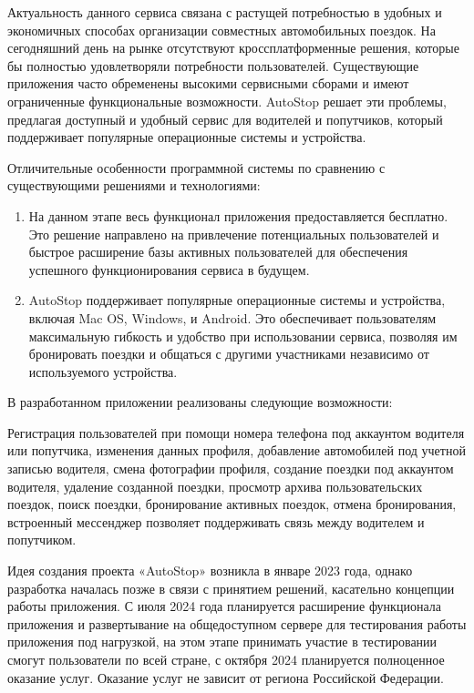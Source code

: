 Актуальность данного сервиса связана с растущей потребностью в удобных и экономичных способах организации совместных автомобильных поездок. На сегодняшний день на рынке отсутствуют кроссплатформенные решения, которые бы полностью удовлетворяли потребности пользователей. Существующие приложения часто обременены высокими сервисными сборами и имеют ограниченные функциональные возможности. AutoStop решает эти проблемы, предлагая доступный и удобный сервис для водителей и попутчиков, который поддерживает популярные операционные системы и устройства.

Отличительные особенности программной системы по сравнению с существующими решениями и технологиями:

\begin{enumerate}
	\item На данном этапе весь функционал приложения предоставляется бесплатно. Это решение направлено на привлечение потенциальных пользователей и быстрое расширение базы активных пользователей для обеспечения успешного функционирования сервиса в будущем.
	\item AutoStop поддерживает популярные операционные системы и устройства, включая Mac OS, Windows, и Android. Это обеспечивает пользователям максимальную гибкость и удобство при использовании сервиса, позволяя им бронировать поездки и общаться с другими участниками независимо от используемого устройства.
\end{enumerate}

В разработанном приложении реализованы следующие возможности:

Регистрация пользователей при помощи номера телефона под аккаунтом водителя или попутчика, изменения данных профиля, добавление автомобилей под учетной записью водителя, смена фотографии профиля, создание поездки под аккаунтом водителя, удаление созданной поездки, просмотр архива пользовательских поездок, поиск поездки, бронирование активных поездок, отмена бронирования, встроенный мессенджер позволяет поддерживать связь между водителем и попутчиком.

Идея создания проекта «AutoStop» возникла в январе 2023 года, однако разработка началась позже в связи с принятием решений, касательно концепции работы приложения. С июля 2024 года планируется расширение функционала приложения и развертывание на общедоступном сервере для тестирования работы приложения под нагрузкой, на этом этапе принимать участие в тестировании смогут пользователи по всей стране, с октября 2024 планируется полноценное оказание услуг. Оказание услуг не зависит от региона Российской Федерации.

